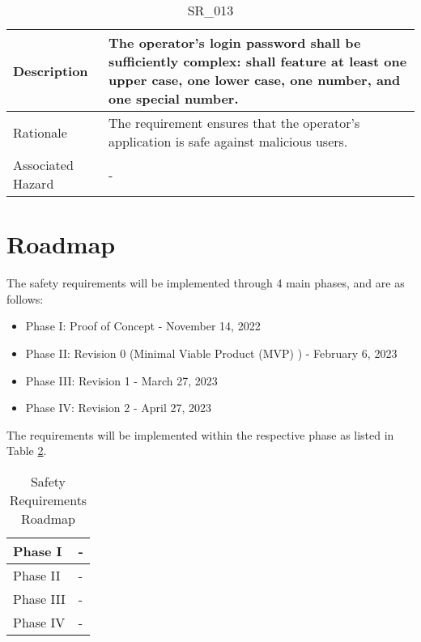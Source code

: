 \documentclass{article}
\begin{document}
\begin{table}[!h]
\begin{center}
\caption {SR\_013} 
\label{SR_013}
\begin{tabular}{ | m{3cm} | m{11cm} | }
\hline
Description & The operator's login password shall be sufficiently complex: shall feature at least one upper case, one lower case, one number, and one special number. \\
\hline
Rationale & The requirement ensures that the operator's application is safe against malicious users. \\
\hline
Associated Hazard & - \\
\hline
\end{tabular}
\end{center}
\end{table}

\clearpage

\section{Roadmap}

The safety requirements will be implemented through 4 main phases, and are as follows:
\begin{itemize}
    \item Phase I: Proof of Concept - November 14, 2022
    \item Phase II: Revision 0 (Minimal Viable Product (MVP) ) - February 6, 2023 
    \item Phase III: Revision 1 - March 27, 2023
    \item Phase IV: Revision 2 - April 27, 2023
\end{itemize}

The requirements will be implemented within the respective phase as listed in Table \ref{SR_Roadmap}.

\begin{table}[!h]
\begin{center}
\caption {Safety Requirements Roadmap}
\label{SR_Roadmap}
\begin{tabular}{ | m{3cm} | m{11cm} | }
\hline
Phase I & - \\
\hline
Phase II & - \\
\hline
Phase III & - \\
\hline
Phase IV & - \\
\hline
\end{tabular}
\end{center}
\end{table}
\end{document}

